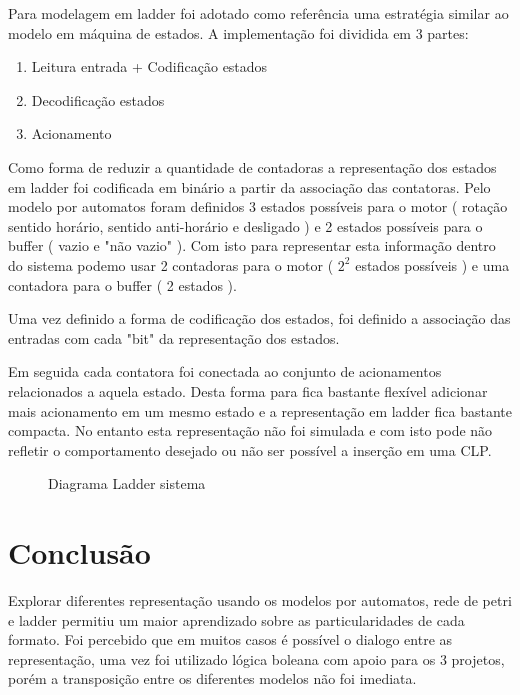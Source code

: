 \documentclass[a4paper,11pt]{article}
\begin{document}
Para modelagem em ladder foi adotado como referência uma estratégia similar ao modelo em máquina de estados. A implementação foi dividida em 3 partes:

\begin{enumerate}
    \item Leitura entrada + Codificação estados
    \item Decodificação estados
    \item Acionamento
\end{enumerate}

Como forma de reduzir a quantidade de contadoras a representação dos estados em ladder foi codificada em binário a partir da associação das contatoras. Pelo modelo por automatos foram definidos 3 estados possíveis para o motor ( rotação sentido horário, sentido anti-horário e desligado ) e 2 estados possíveis para o buffer ( vazio e "não vazio" ). Com isto para representar esta informação dentro do sistema podemo usar 2 contadoras para o motor ( $2^2$ estados possíveis ) e uma contadora para o buffer ( 2 estados ).

Uma vez definido a forma de codificação dos estados, foi definido a associação das entradas com cada "bit" da representação dos estados.

Em seguida cada contatora foi conectada ao conjunto de acionamentos relacionados a aquela estado. Desta forma para fica bastante flexível adicionar mais acionamento em um mesmo estado e a representação em ladder fica bastante compacta. No entanto esta representação não foi simulada e com isto pode não refletir o comportamento desejado ou não ser possível a inserção em uma CLP.

\begin{figure}[H]
    \centering
    
    \caption{Diagrama Ladder sistema}
    \label{fig:my_label}
\end{figure}

\section{Conclusão}

Explorar diferentes representação usando os modelos por automatos, rede de petri e ladder permitiu um maior aprendizado sobre as particularidades de cada formato. Foi percebido que em muitos casos é possível o dialogo entre as representação, uma vez foi utilizado lógica boleana com apoio para os 3 projetos, porém a transposição entre os diferentes modelos não foi imediata.
\end{document}
